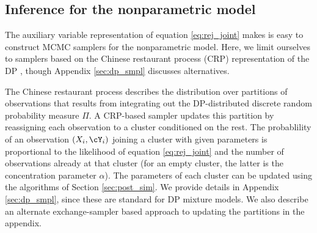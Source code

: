 \subsection{Inference for the nonparametric model}
The auxiliary variable representation of equation \eqref{eq:rej_joint} makes is easy to construct MCMC samplers for the nonparametric model.
Here, we limit ourselves to samplers based on the Chinese restaurant process (CRP) representation of the DP \citep{Nea2000}, though Appendix \ref{sec:dp_smpl}
discusses alternatives.

The Chinese restaurant process describes the distribution over partitions of observations that results from integrating out the DP-distributed
discrete random probability measure $\Pi$. A CRP-based sampler updates this partition by reassigning each observation to a cluster conditioned on the
rest. The probablility of an observation $(X_i, \cY_i)$ joining a cluster with given parameters is proportional to
the likelihood of equation \eqref{eq:rej_joint} and  the number of observations already at that cluster (for an empty cluster, the latter is the
concentration parameter $\alpha$).
The parameters of each cluster can be updated using the algorithms of Section \ref{sec:post_sim}.
We provide details in Appendix \ref{sec:dp_smpl}, since these are standard for DP mixture models. We also describe an alternate
exchange-sampler based approach to updating the partitions in the appendix.



